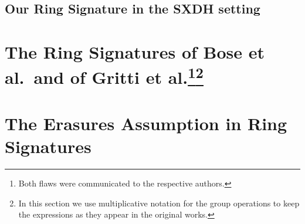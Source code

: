 \documentclass{llncs}
\begin{document}
		\subsection{Our Ring Signature in the SXDH setting}
			
			
	\section{The Ring Signatures of Bose et al.~and of Gritti et al.\protect\footnote{Both flaws were communicated to the respective authors.}\protect\footnote{In this section we use multiplicative notation for the group operations to keep the expressions as they appear in the original works.}}\label{sec:rs-flawed}
    
        	 
        	 
        	 \section{The Erasures Assumption in Ring Signatures} \label{sec:erasures}
        	 
        	 	

%
%	
%
%		
%
%
%		
%		
%
%
%
%		
%
%
%		
\end{document}
